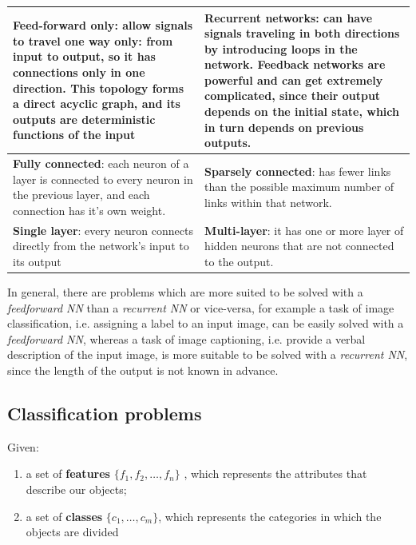 \begin{table}[H]
	\centering
	\begin{tabular}{| p{7.5cm} | p{7.5cm} |}
		\hline
		\textbf{Feed-forward only}: allow signals to travel one way only: from input to output, so it has connections only in one direction. This topology forms a direct acyclic graph, and its outputs are deterministic functions of the input & \textbf{Recurrent networks}: can have signals traveling in both directions by introducing loops in the network. Feedback networks are powerful and can get extremely complicated, since their output depends on the initial state, which in turn depends on previous outputs.\\
		\hline
		\textbf{Fully connected}: each neuron of a layer is connected to every neuron in the previous layer, and each connection has it's own weight. & \textbf{Sparsely connected}: has fewer links than the possible maximum number of links within that network.  \\
		\hline
		\textbf{Single layer}: every neuron connects directly from the network's input to its output & \textbf{Multi-layer}: it has one or more layer of hidden neurons that are not connected to the output.\\
		\hline
	\end{tabular}
\end{table} 

In general, there are problems which are more suited to be solved with a \textit{feedforward NN} than a \textit{recurrent NN} or vice-versa, for example a task of image classification, i.e. assigning a label to an input image, can be easily solved with a \textit{feedforward NN}, whereas a task of image captioning, i.e. provide a verbal description of the input image, is more suitable to be solved with a \textit{recurrent NN}, since the length of the output is not known in advance. 


\subsection{Classification problems}
Given:

\begin{enumerate}

	\item a set of \textbf{features} $\{f_1,f_2,\dots,f_n\}$ , which represents the attributes that describe our objects;
	\item a set of \textbf{classes} $\{c_1,\dots,c_m\}$, which represents the categories in which the objects are divided
 
\end{enumerate}

